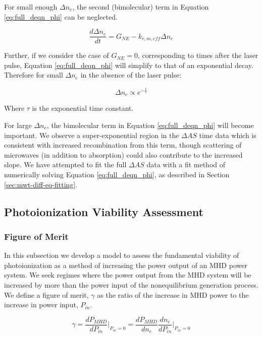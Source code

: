 For small enough $\Delta n_e$, the second (bimolecular) term in Equation \ref{eq:full_deqn_phi} can be neglected. 

\begin{equation}
  \label{eq:small_pert_diffeq}
\frac{d\Delta n_{e}}{dt} = G_{NE} - k_{r,m,eff} \Delta n_{e}
\end{equation}

Further, if we consider the case of $G_{NE} = 0$, corresponding to times after the laser pulse, Equation \ref{eq:full_deqn_phi} will simplify to that of an exponential decay. Therefore for small $\Delta n_e$ in the absence of the laser pulse: 

\begin{equation}
  \label{eq:ne_exp_decay}
  \Delta n_e \propto e^{-\frac{t}{\tau}}
\end{equation}

Where $\tau$ is the exponential time constant. 

For large $\Delta n_e$, the bimolecular term in Equation \ref{eq:full_deqn_phi} will become important. We observe a super-exponential region in the $\Delta AS$ time data which is consistent with increased recombination from this term, though scattering of microwaves (in addition to absorption) could also contribute to the increased slope. We have attempted to fit the full $\Delta AS$ data with a fit method of numerically solving Equation \ref{eq:full_deqn_phi}, as described in Section \ref{sec:mwt-diff-eq-fitting}. 

\subsection{Photoionization Viability Assessment}

\subsubsection{Figure of Merit}

In this subsection we develop a model to assess the fundamental viability of photoionization as a method of increasing the power output of an MHD power system. We seek regimes where the power output from the MHD system will be increased by more than the power input of the nonequilibrium generation process. We define a figure of merit, $\gamma$ as the ratio of the increase in MHD power to the increase in power input, $P_{in}$.


\begin{equation}
  \label{eq:beta_def}
\gamma = \frac{dP_{MHD}}{dP_{in}} \Big|_{P_{in}=0} = \frac{dP_{MHD}}{dn_{e}}\frac{dn_{e}}{dP_{in}}\Big|_{P_{in}=0}
\end{equation}

